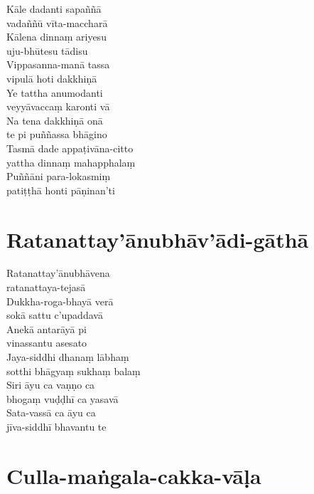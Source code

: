 
\begin{paritta}
  Kāle dadanti sapaññā\\\vin vadaññū vīta-maccharā\\
  Kālena dinnaṃ ariyesu\\\vin uju-bhūtesu tādisu\\
  Vippasanna-manā tassa\\\vin vipulā hoti dakkhiṇā\\
  Ye tattha anumodanti\\\vin veyyāvaccaṃ karonti vā\\
  Na tena dakkhiṇā onā\\\vin te pi puññassa bhāgino\\
  Tasmā dade appaṭivāna-citto\\\vin yattha dinnaṃ mahapphalaṃ\\
  Puññāni para-lokasmiṃ\\\vin patiṭṭhā honti pāṇinan'ti 
\end{paritta}

\section{Ratanattay'ānubhāv'ādi-gāthā}


\begin{paritta}
  Ratanattay'ānubhāvena\\\vin ratanattaya-tejasā\\
  Dukkha-roga-bhayā verā\\\vin sokā sattu c'upaddavā\\
  Anekā antarāyā pi\\\vin vinassantu asesato\\
  Jaya-siddhi dhanaṃ lābhaṃ\\\vin sotthi bhāgyaṃ sukhaṃ balaṃ\\
  Siri āyu ca vaṇṇo ca\\\vin bhogaṃ vuḍḍhī ca yasavā\\
  Sata-vassā ca āyu ca\\\vin jīva-siddhī bhavantu te
\end{paritta}

\section{Culla-maṅgala-cakka-vāḷa}

